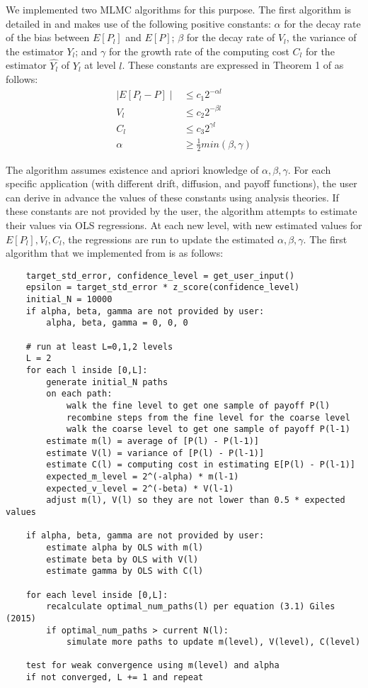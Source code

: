 \documentclass{article}
\begin{document}
	We implemented two MLMC algorithms for this purpose. The first algorithm is detailed in \cite{giles15} and makes use of the following positive constants: $\alpha$ for the decay rate of the bias between $E[P_l]$ and $E[P]$; $\beta$ for the decay rate of $V_l$, the variance of the estimator $Y_l$; and $\gamma$ for the growth rate of the computing cost $C_l$ for the estimator $\widehat{Y_l}$ of $Y_l$ at level $l$. These constants are expressed in Theorem 1 of \cite{giles15} as follows:
	\begin{align*}
	\mid E[P_l -P] \mid &\leq c_1 2^{-\alpha l} \\
	V_l &\leq c_2 2^{-\beta l} \\
	C_l &\leq c_3 2^{\gamma l} \\
    \alpha &\geq \frac{1}{2} min(\beta, \gamma)
	\end{align*}
	
	The algorithm assumes existence and apriori knowledge of $\alpha, \beta, \gamma$. For each specific application (with different drift, diffusion, and payoff functions), the user can derive in advance the values of these constants using analysis theories. If these constants are not provided by the user, the algorithm attempts to estimate their values via OLS regressions. At each new level, with new estimated values for $E[P_l], V_l, C_l$, the regressions are run to update the estimated $\alpha, \beta, \gamma$. The first algorithm that we implemented from \cite{giles15} is as follows:
    
	\begin{lstlisting}
	target_std_error, confidence_level = get_user_input()
    epsilon = target_std_error * z_score(confidence_level)
	initial_N = 10000
    if alpha, beta, gamma are not provided by user:
        alpha, beta, gamma = 0, 0, 0
	
    # run at least L=0,1,2 levels 
    L = 2
    for each l inside [0,L]:
        generate initial_N paths
        on each path:
            walk the fine level to get one sample of payoff P(l)
            recombine steps from the fine level for the coarse level
            walk the coarse level to get one sample of payoff P(l-1)
        estimate m(l) = average of [P(l) - P(l-1)]
        estimate V(l) = variance of [P(l) - P(l-1)]
        estimate C(l) = computing cost in estimating E[P(l) - P(l-1)]
        expected_m_level = 2^(-alpha) * m(l-1)
        expected_v_level = 2^(-beta) * V(l-1)
        adjust m(l), V(l) so they are not lower than 0.5 * expected values
    
    if alpha, beta, gamma are not provided by user:
        estimate alpha by OLS with m(l)
        estimate beta by OLS with V(l)
        estimate gamma by OLS with C(l)
    
    for each level inside [0,L]:
        recalculate optimal_num_paths(l) per equation (3.1) Giles (2015)    
        if optimal_num_paths > current N(l):
            simulate more paths to update m(level), V(level), C(level)
    
    test for weak convergence using m(level) and alpha
    if not converged, L += 1 and repeat    
    \end{lstlisting}   
        
\end{document}
